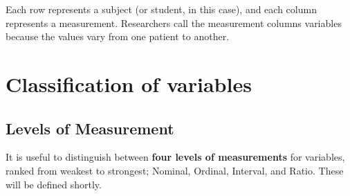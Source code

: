 \documentclass[11pt]{book}\usepackage[]{graphicx}\usepackage[]{color}
\begin{document}
Each row represents a subject (or student, in this case), and each column represents a measurement.  Researchers call the measurement columns 
variables because the values vary from one patient to another.

\section{Classification of variables}   

\subsection{Levels of Measurement}

It is useful to distinguish between \textbf{four levels of measurements} for variables, ranked from weakest to strongest; Nominal, Ordinal, Interval, and Ratio.  These will be defined shortly. 
\end{document}
